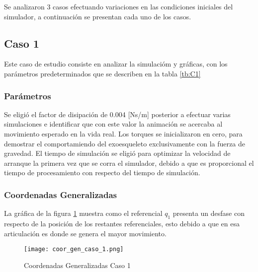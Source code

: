 Se analizaron 3 casos efectuando variaciones en las condiciones iniciales del simulador, a continuación se presentan cada uno de los casos.

\subsection{Caso 1}
    Este caso de estudio consiste en analizar la simulacióm y gráficas, con los parámetros  predeterminados que se describen en la tabla \ref{tb:C1}
    \subsubsection{Parámetros}

    Se eligió el factor de disipación de 0.004 [Ns/m] posterior a efectuar varias simulaciones e identificar que con este valor la animación se acercaba al movimiento esperado en la vida real.
    Los torques se inicializaron en cero, para demostrar el comportamiendo del exoesqueleto exclusivamente con la fuerza de gravedad.
    El tiempo de simulación se eligió para optimizar la velocidad de arranque la primera vez que se corra el simulador, debido a que es proporcional el tiempo de procesamiento con respecto del tiempo de simulación.
    \begin{table}[H]%
        \centering
        \begin{center}
        \caption{Parámetros originales del simulador (Sistema No Conservativo)} 
        \centering
        \bigskip
        \end{center}
    \label{tb:C1}
    \end{table}

    \subsubsection{Coordenadas Generalizadas}
    La gráfica de la figura \ref{fig:CoordGenC1} muestra como el referencial $q_1$ presenta un desfase con respecto de la posición de los restantes referenciales, esto debido a que en esa articulación es donde se genera el mayor movimiento. 
    \begin{figure} [H]%
            \centering
            \texttt{[image: coor\_gen\_caso\_1.png]} 
        \caption{Coordenadas Generalizadas Caso 1}
        \label{fig:CoordGenC1}
    \end{figure}

